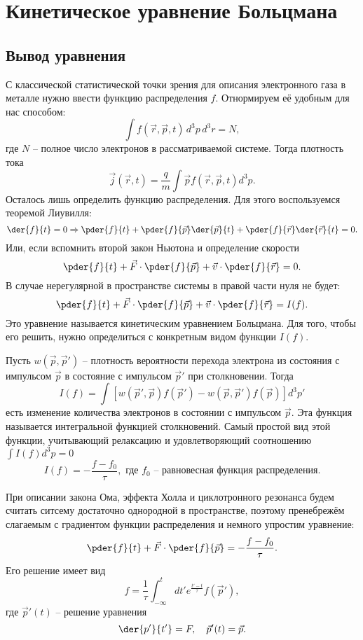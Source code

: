 \section{Кинетическое уравнение Больцмана}
\subsection{Вывод уравнения}

С классической статистической точки зрения для описания электронного газа в
металле нужно ввести функцию распределения \( f \). Отнормируем её удобным для
нас способом:
\[
    \int f(\vec{r},\vec{p},t)\,d^3p\,d^3r = N,
\]
где \( N \) -- полное число электронов в рассматриваемой системе. Тогда
плотность тока
\[
    \vec{j}(\vec{r},t) = \frac{q}{m} \int \vec{p} f(\vec{r},\vec{p},t) d^3p.
\]
Осталось лишь определить функцию распределения. Для этого воспользуемся теоремой
Лиувилля:
\[
    \der{f}{t} = 0 \Rightarrow
    \pder{f}{t} + \pder{f}{\vec{p}}\der{\vec{p}}{t} +
    \pder{f}{\vec{r}}\der{\vec{r}}{t} = 0.
\]
Или, если вспомнить второй закон Ньютона и определение скорости
\[
    \pder{f}{t} + \vec{F}\cdot\pder{f}{\vec{p}} + \vec{v}\cdot\pder{f}{\vec{r}}
    = 0.
\]
В случае нерегулярной в пространстве системы в правой части нуля не будет:
\[
    \pder{f}{t} + \vec{F}\cdot\pder{f}{\vec{p}} + \vec{v}\cdot\pder{f}{\vec{r}}
    = I(f).
\]
Это уравнение называется кинетическим уравнением Больцмана. Для того, чтобы его
решить, нужно определиться с конкретным видом функции \( I(f) \).

Пусть \( w(\vec{p},\vec{p}') \) -- плотность вероятности перехода электрона из
состояния с импульсом \( \vec{p} \) в состояние с импульсом \( \vec{p}' \) при
столкновении. Тогда
\[
    I(f) =
        \int [w(\vec{p}',\vec{p})f(\vec{p}')-w(\vec{p},\vec{p}')f(\vec{p})]d^3p'
\]
есть изменение количества электронов в состоянии с импульсом \( \vec{p} \). Эта
функция называется интегральной функцией столкновений. Самый простой вид этой
функции, учитывающий релаксацию и удовлетворяющий соотношению
\( \int I(f) d^3p = 0 \)
\[
    I(f) = -\frac{f - f_0}{\tau},\text{ где } f_0
    \text{ -- равновесная функция распределения.}
\]

При описании закона Ома, эффекта Холла и циклотронного резонанса будем считать
ситсему достаточно однородной в пространстве, поэтому пренебрежём слагаемым с
градиентом функции распределения и немного упростим уравнение:
\[
    \pder{f}{t} + \vec{F}\cdot\pder{f}{\vec{p}} = -\frac{f-f_0}{\tau}.
\]
Его решение имеет вид
\[
    f = \frac{1}{\tau}\int_{-\infty}^t dt' e^\frac{t'-t}{\tau} f(\vec{p}'),
\]
где \( \vec{p}'(t) \) -- решение уравнения
\[
    \der{p'}{t'} = F, \quad \vec{p}'(t) = \vec{p}.
\]

